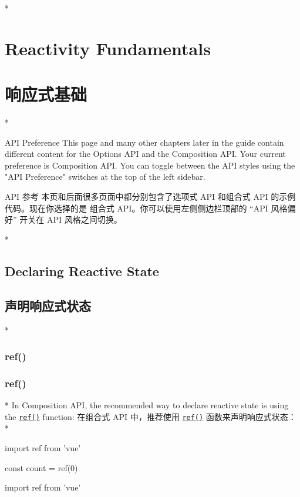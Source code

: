 \begin{paracol}{2}
\switchcolumn[0]*%
\section{Reactivity Fundamentals}
\switchcolumn
\section{响应式基础}
\switchcolumn[0]*%
\begin{vueQuote}{API Preference}
This page and many other chapters later in the guide contain different
content for the Options API and the Composition API. Your current
preference is Composition API. You can toggle between the API styles
using the "API Preference" switches at the top of the left sidebar.
\end{vueQuote} 
\switchcolumn
\begin{vueQuote}{API 参考}
本页和后面很多页面中都分别包含了选项式 API 和组合式 API
的示例代码。现在你选择的是 组合式 API。你可以使用左侧侧边栏顶部的 ``API
风格偏好'' 开关在 API 风格之间切换。
\end{vueQuote} 
\switchcolumn[0]*%
\subsection{Declaring Reactive State}
\switchcolumn
\subsection{声明响应式状态}
\switchcolumn[0]*%
\subsubsection{ref()}
\switchcolumn
\subsubsection{ref()}
\switchcolumn[0]*%
In Composition API, the recommended way to declare reactive state is
using the
\href{https://vuejs.org/api/reactivity-core.html\#ref}{\texttt{ref()}}
function:
\switchcolumn
在组合式 API 中，推荐使用
\href{https://cn.vuejs.org/api/reactivity-core.html\#ref}{\texttt{ref()}}
函数来声明响应式状态：
\switchcolumn[0]*%
\begin{codeJs}
import { ref } from 'vue'

const count = ref(0)
\end{codeJs}
\switchcolumn
\begin{codeJs}
import { ref } from 'vue'


\end{codeJs}
\end{paracol}
